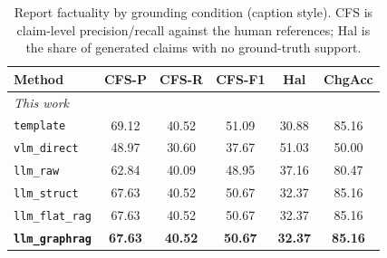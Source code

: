 \begin{table}[t]
\centering
\caption{Report factuality by grounding condition (caption style). CFS is claim-level precision/recall against the human references; Hal is the share of generated claims with no ground-truth support.}
\label{tab:factuality_caption}
\setlength{\tabcolsep}{3pt}
\begin{tabular}{lccccc}
\toprule
Method & CFS-P & CFS-R & CFS-F1 & Hal & ChgAcc \\
\midrule
\multicolumn{6}{l}{\emph{This work}} \\
\texttt{template} & 69.12 & 40.52 & 51.09 & 30.88 & 85.16 \\
\texttt{vlm\_direct} & 48.97 & 30.60 & 37.67 & 51.03 & 50.00 \\
\texttt{llm\_raw} & 62.84 & 40.09 & 48.95 & 37.16 & 80.47 \\
\texttt{llm\_struct} & 67.63 & 40.52 & 50.67 & 32.37 & 85.16 \\
\texttt{llm\_flat\_rag} & 67.63 & 40.52 & 50.67 & 32.37 & 85.16 \\
\textbf{\texttt{llm\_graphrag}} & \textbf{67.63} & \textbf{40.52} & \textbf{50.67} & \textbf{32.37} & \textbf{85.16} \\
\bottomrule
\end{tabular}
\end{table}
